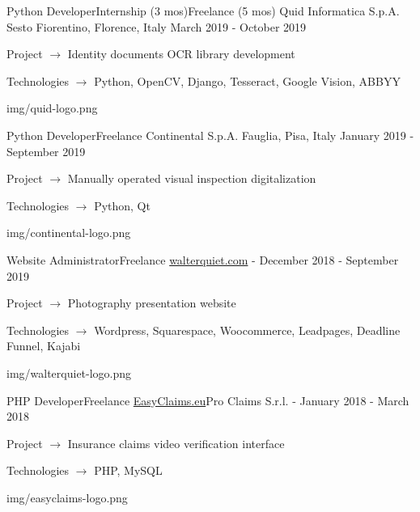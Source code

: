 
\begin{cventries}

  \logocventry
    {Python Developer{\enskip\cdotp\enskip}Internship (3 mos){\enskip\cdotp\enskip}Freelance (5 mos)}
    {Quid Informatica S.p.A.}
    {Sesto Fiorentino, Florence, Italy}
    {March 2019 - October 2019}
    {
      \begin{cvitems}
        \item {Project $\rightarrow$ Identity documents OCR library development}
        \item {Technologies $\rightarrow$ Python, OpenCV, Django, Tesseract, Google Vision, ABBYY}
      \end{cvitems}
    }
    {img/quid-logo.png}

  \logocventry
    {Python Developer{\enskip\cdotp\enskip}Freelance}
    {Continental S.p.A.}
    {Fauglia, Pisa, Italy}
    {January 2019 - September 2019}
    {
      \begin{cvitems}
        \item {Project $\rightarrow$ Manually operated visual inspection digitalization}
        \item {Technologies $\rightarrow$ Python, Qt}
      \end{cvitems}
    }
    {img/continental-logo.png}

  \logocventry
    {Website Administrator{\enskip\cdotp\enskip}Freelance}
    {\href{https://www.walterquiet.com}{walterquiet.com}}
    {-}
    {December 2018 - September 2019}
    {
      \begin{cvitems}
        \item {Project $\rightarrow$ Photography presentation website}
        \item {Technologies $\rightarrow$ Wordpress, Squarespace, Woocommerce, Leadpages, Deadline Funnel, Kajabi}
      \end{cvitems}
    }
    {img/walterquiet-logo.png}

  \logocventry
    {PHP Developer{\enskip\cdotp\enskip}Freelance}
    {\href{https://www.easyclaims.eu}{EasyClaims.eu}{\enskip\cdotp\enskip}Pro Claims S.r.l.}
    {-}
    {January 2018 - March 2018}
    {
      \begin{cvitems}
        \item {Project $\rightarrow$ Insurance claims video verification interface}
        \item {Technologies $\rightarrow$ PHP, MySQL}
      \end{cvitems}
    }
    {img/easyclaims-logo.png}


\end{cventries}
